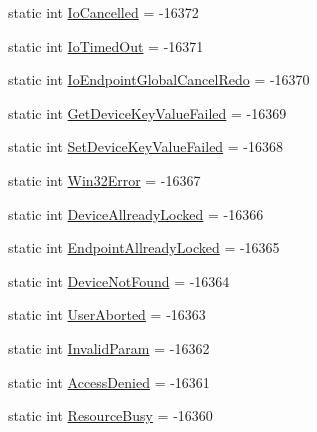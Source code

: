 \begin{DoxyCompactItemize}
\item 
static int \hyperlink{classcom_1_1clover_1_1remotepay_1_1sdk_1_1_clover_device_error_event_aac83517fd19282a35f68d70ecf47ed55}{Io\+Cancelled} = -\/16372
\item 
static int \hyperlink{classcom_1_1clover_1_1remotepay_1_1sdk_1_1_clover_device_error_event_a64f680fd07a5976eb066c375d4d97464}{Io\+Timed\+Out} = -\/16371
\item 
static int \hyperlink{classcom_1_1clover_1_1remotepay_1_1sdk_1_1_clover_device_error_event_aed08e39e8ca03a8389b80064bd7cf1a1}{Io\+Endpoint\+Global\+Cancel\+Redo} = -\/16370
\item 
static int \hyperlink{classcom_1_1clover_1_1remotepay_1_1sdk_1_1_clover_device_error_event_a9e00ff0b15955bca9100efa26b2cfdcb}{Get\+Device\+Key\+Value\+Failed} = -\/16369
\item 
static int \hyperlink{classcom_1_1clover_1_1remotepay_1_1sdk_1_1_clover_device_error_event_a5816e46eafe616e2f78e7cc465ab3a53}{Set\+Device\+Key\+Value\+Failed} = -\/16368
\item 
static int \hyperlink{classcom_1_1clover_1_1remotepay_1_1sdk_1_1_clover_device_error_event_a0bb23dac2903f8b21bf322bac19822d4}{Win32\+Error} = -\/16367
\item 
static int \hyperlink{classcom_1_1clover_1_1remotepay_1_1sdk_1_1_clover_device_error_event_abb6d4f6e0644f508186774f78113972b}{Device\+Allready\+Locked} = -\/16366
\item 
static int \hyperlink{classcom_1_1clover_1_1remotepay_1_1sdk_1_1_clover_device_error_event_a759ffdef5052fd3698fc55f6fbd058b8}{Endpoint\+Allready\+Locked} = -\/16365
\item 
static int \hyperlink{classcom_1_1clover_1_1remotepay_1_1sdk_1_1_clover_device_error_event_ab654af2cfa0ea1e9bc8530cdca80b818}{Device\+Not\+Found} = -\/16364
\item 
static int \hyperlink{classcom_1_1clover_1_1remotepay_1_1sdk_1_1_clover_device_error_event_a12de9f180970f9ef3a6e54a21e7a93ae}{User\+Aborted} = -\/16363
\item 
static int \hyperlink{classcom_1_1clover_1_1remotepay_1_1sdk_1_1_clover_device_error_event_ac7eaa9725b83fc717745c8ab98c4037c}{Invalid\+Param} = -\/16362
\item 
static int \hyperlink{classcom_1_1clover_1_1remotepay_1_1sdk_1_1_clover_device_error_event_a3ab8f0caa1c683630fb5fb642ecd85d1}{Access\+Denied} = -\/16361
\item 
static int \hyperlink{classcom_1_1clover_1_1remotepay_1_1sdk_1_1_clover_device_error_event_a0a4cd724b42ac9ec54b3af52debdeef2}{Resource\+Busy} = -\/16360

\end{DoxyCompactItemize}
